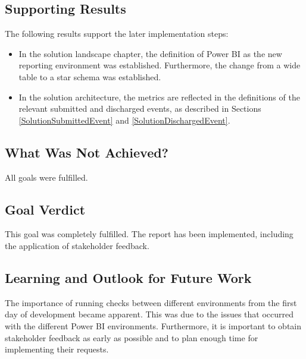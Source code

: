\subsection*{Supporting Results}

The following results support the later implementation steps:

\begin{itemize}
    \item In the solution landscape chapter, the definition of Power BI as the new reporting environment was established. Furthermore, the change from a wide table to a star schema was established.

    \item In the solution architecture, the metrics are reflected in the definitions of the relevant submitted and discharged events, as described in Sections \ref{SolutionSubmittedEvent} and \ref{SolutionDischargedEvent}.
\end{itemize}

\subsection*{What Was Not Achieved?}

All goals were fulfilled.

\subsection*{Goal Verdict}

This goal was completely fulfilled. The report has been implemented, including the application of stakeholder feedback.

\subsection*{Learning and Outlook for Future Work}

The importance of running checks between different environments from the first day of development became apparent. This was due to the issues that occurred with the different Power BI environments. Furthermore, it is important to obtain stakeholder feedback as early as possible and to plan enough time for implementing their requests.